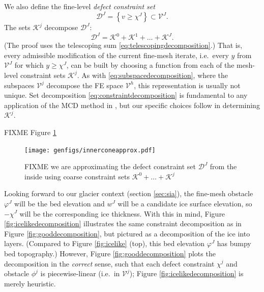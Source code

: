 \documentclass[letterpaper,final,12pt,reqno]{amsart}
\theoremstyle{claim}
\numberwithin{equation}{section}
\numberwithin{figure}{section}
\numberwithin{table}{section}
\numberwithin{theorem}{section}
\begin{document}
We also define the fine-level \emph{defect constraint set}
\begin{equation}
  \mathcal{D}^J = \left\{v \ge \chi^J\right\} \subset \mathcal{V}^J.
\end{equation}
The sets $\mathcal{K}^j$ decompose $\mathcal{D}^J$:
\begin{equation}
  \mathcal{D}^J = \mathcal{K}^0 + \mathcal{K}^1 + \dots + \mathcal{K}^J. \label{eq:constraintdecomposition}
\end{equation}
(The proof uses the telescoping sum \eqref{eq:telescopingdecomposition}.)  That is, every admissible modification of the current fine-mesh iterate, i.e.~every $y$ from $\mathcal{V}^J$ for which $y\ge \chi^J$, can be built by choosing a function from each of the mesh-level constraint sets $\mathcal{K}^j$.  As with \eqref{eq:subspacedecomposition}, where the subspaces $\mathcal{V}^j$ decompose the FE space $\mathcal{V}^h$, this representation is usually not unique.  Set decomposition \eqref{eq:constraintdecomposition} is fundamental to any application of the MCD method in \cite{Tai2003}, but our specific choices follow \cite{GraeserKornhuber2009} in determining $\mathcal{K}^j$.

FIXME Figure \ref{fig:innerconeapprox}

\begin{figure}
\texttt{[image: genfigs/innerconeapprox.pdf]}

\caption{FIXME we are approximating the defect constraint set $\mathcal{D}^J$ from the inside using coarse constraint sets $\mathcal{K}^0+\dots+\mathcal{K}^j$}
\label{fig:innerconeapprox}
\end{figure}

Looking forward to our glacier context (section \ref{sec:sia}), the fine-mesh obstacle $\varphi^J$ will be the bed elevation and $w^J$ will be a candidate ice surface elevation, so $-\chi^J$ will be the corresponding ice thickness.  With this in mind, Figure \ref{fig:icelikedecomposition} illustrates the same constraint decomposition as in Figure \ref{fig:gooddecomposition}, but pictured as a decomposition of the ice into layers.  (Compared to Figure \ref{fig:icelike} (top), this bed elevation $\varphi^J$ has bumpy bed topography.)  However, Figure \ref{fig:gooddecomposition} plots the decomposition in the \emph{correct} sense, such that each defect constraint $\chi^j$ and obstacle $\phi^j$ is piecewise-linear (i.e.~in $\mathcal{V}^j$); Figure \ref{fig:icelikedecomposition} is merely heuristic.
\end{document}
